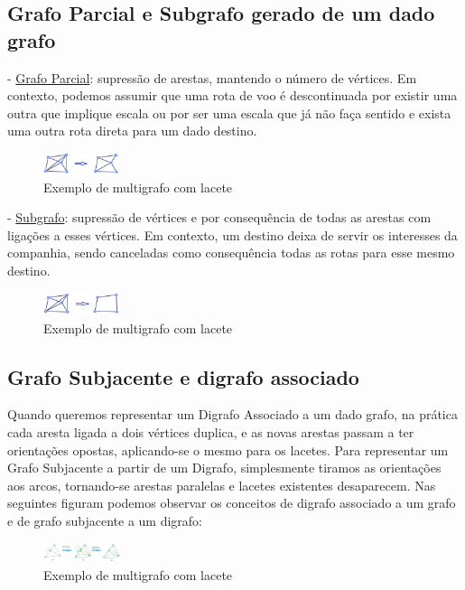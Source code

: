 \subsection{Grafo Parcial e Subgrafo gerado de um dado grafo}
- \underline{Grafo Parcial}: supressão de arestas, mantendo o número de vértices. Em contexto, podemos assumir 
que uma rota de voo é descontinuada por existir uma outra que implique escala ou por ser uma escala que já 
não faça sentido e exista uma outra rota direta para um dado destino.
\linebreak
\begin{figure}[h]
    \centering
    \includegraphics[width=0.2\textwidth]{imgs/Figura6}
    \caption{Exemplo de multigrafo com lacete\label{fig:imagem6}}
\end{figure}
\linebreak
- \underline{Subgrafo}: supressão de vértices e por consequência de todas as arestas com ligações a esses vértices. 
Em contexto, um destino deixa de servir os interesses da companhia, sendo canceladas como consequência 
todas as rotas para esse mesmo destino.
\linebreak
\begin{figure}[h]
    \centering
    \includegraphics[width=0.2\textwidth]{imgs/Figura7}
    \caption{Exemplo de multigrafo com lacete\label{fig:imagem7}}
\end{figure}

\subsection{Grafo Subjacente e digrafo associado}
Quando queremos representar um Digrafo Associado a um dado grafo, na prática cada aresta ligada a 
dois vértices duplica, e as novas arestas passam a ter orientações opostas, aplicando-se o mesmo para os 
lacetes.
\indent Para representar um Grafo Subjacente a partir de um Digrafo, simplesmente tiramos as orientações aos 
arcos, tornando-se arestas paralelas e lacetes existentes desaparecem.
\indent Nas seguintes figuram podemos observar os conceitos de digrafo associado a um grafo e de grafo 
subjacente a um digrafo:
\linebreak
\begin{figure}[h]
    \centering
    \includegraphics[width=0.2\textwidth]{imgs/Figura8}
    \caption{Exemplo de multigrafo com lacete\label{fig:imagem8}}
\end{figure}
